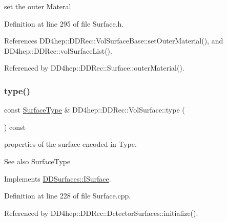 set the outer Materal 



Definition at line 295 of file Surface.\+h.



References D\+D4hep\+::\+D\+D\+Rec\+::\+Vol\+Surface\+Base\+::set\+Outer\+Material(), and D\+D4hep\+::\+D\+D\+Rec\+::vol\+Surface\+List().



Referenced by D\+D4hep\+::\+D\+D\+Rec\+::\+Surface\+::outer\+Material().

\hypertarget{class_d_d4hep_1_1_d_d_rec_1_1_vol_surface_a7a08c8fe2dcd9c0e0fe24f1400f29789}{}\label{class_d_d4hep_1_1_d_d_rec_1_1_vol_surface_a7a08c8fe2dcd9c0e0fe24f1400f29789} 
\subsubsection{\texorpdfstring{type()}{type()}}
{\footnotesize\ttfamily const \hyperlink{class_d_d_surfaces_1_1_surface_type}{Surface\+Type} \& D\+D4hep\+::\+D\+D\+Rec\+::\+Vol\+Surface\+::type (\begin{DoxyParamCaption}{ }\end{DoxyParamCaption}) const\hspace{0.3cm}{\ttfamily [virtual]}}

properties of the surface encoded in Type. \begin{DoxySeeAlso}{See also}
Surface\+Type 
\end{DoxySeeAlso}


Implements \hyperlink{class_d_d_surfaces_1_1_i_surface_aab772d11a61d7ae966d535be0da2a626}{D\+D\+Surfaces\+::\+I\+Surface}.



Definition at line 228 of file Surface.\+cpp.



Referenced by D\+D4hep\+::\+D\+D\+Rec\+::\+Detector\+Surfaces\+::initialize().

\hypertarget{class_d_d4hep_1_1_d_d_rec_1_1_vol_surface_a91c03b8e7e29245a1c955d459b3077ae}{}\label{class_d_d4hep_1_1_d_d_rec_1_1_vol_surface_a91c03b8e7e29245a1c955d459b3077ae} 

